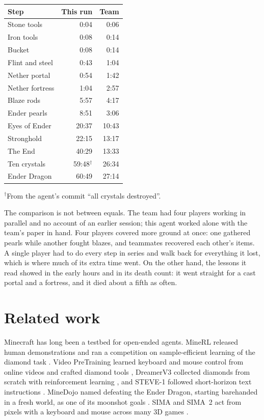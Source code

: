 \documentclass[11pt,a4paper]{article}
\begin{document}
\begin{table}[t]
\begin{minipage}[t]{0.40\textwidth}
\begin{tabularx}{\linewidth}{@{}Xrr@{}}
      \toprule
      \textbf{Step} & \textbf{This run} & \textbf{Team} \\
      \midrule
      Stone tools & 0:04 & 0:06 \\
      Iron tools & 0:08 & 0:14 \\
      Bucket & 0:08 & 0:14 \\
      Flint and steel & 0:43 & 1:04 \\
      Nether portal & 0:54 & 1:42 \\
      Nether fortress & 1:04 & 2:57 \\
      Blaze rods & 5:57 & 4:17 \\
      Ender pearls & 8:51 & 3:06 \\
      Eyes of Ender & 20:37 & 10:43 \\
      Stronghold & 22:15 & 13:17 \\
      The End & 40:29 & 13:33 \\
      Ten crystals & 59:48$^{\dagger}$ & 26:34 \\
      Ender Dragon & 60:49 & 27:14 \\
      \bottomrule
    \end{tabularx}\par\vspace{3pt}
    {\footnotesize $^{\dagger}$From the agent's commit ``all crystals destroyed''.}
  \end{minipage}
\end{table}

The comparison is not between equals. The team had four players working in parallel and no account of an earlier session; this agent worked alone with the team's paper in hand. Four players covered more ground at once: one gathered pearls while another fought blazes, and teammates recovered each other's items. A single player had to do every step in series and walk back for everything it lost, which is where much of its extra time went. On the other hand, the lessons it read showed in the early hours and in its death count: it went straight for a cast portal and a fortress, and it died about a fifth as often.

\section{Related work}

Minecraft has long been a testbed for open-ended agents. MineRL released human demonstrations and ran a competition on sample-efficient learning of the diamond task \citep{guss2019minerl,guss2019competition}. Video PreTraining learned keyboard and mouse control from online videos and crafted diamond tools \citep{baker2022vpt}, DreamerV3 collected diamonds from scratch with reinforcement learning \citep{hafner2025dreamer}, and STEVE-1 followed short-horizon text instructions \citep{lifshitz2023steve}. MineDojo named defeating the Ender Dragon, starting barehanded in a fresh world, as one of its moonshot goals \citep{fan2022minedojo}. SIMA and SIMA~2 act from pixels with a keyboard and mouse across many 3D games \citep{sima2024,sima2025}.
\end{document}
